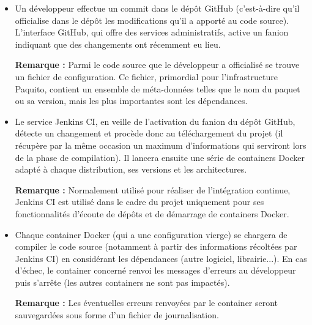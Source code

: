 \documentclass[12pt,a4paper]{article}
\newenvironment{remarque}{\textbf{Remarque :}}{}
\begin{document}
\begin{itemize}\renewcommand{\labelitemi}{$\bullet$}
\item Un développeur effectue un commit dans le dépôt GitHub (c'est-à-dire qu'il officialise dans le dépôt les modifications qu'il a apporté au code source). L'interface GitHub, qui offre des services administratifs, active un fanion indiquant que des changements ont récemment eu lieu.

\begin{remarque}
Parmi le code source que le développeur a officialisé se trouve un fichier de	configuration. Ce fichier, primordial pour l'infrastr\-ucture Paquito, contient un ensemble de 	méta-données telles que le nom du paquet ou sa version, mais les plus importantes sont les dépendances.
\end{remarque}
\item Le service Jenkins CI, en veille de l'activation du fanion du dépôt GitHub, détecte un changement et procède donc au téléchargement du projet (il récupère par la même occasion un maximum d'informations qui serviront lors de la phase de compilation). Il lancera ensuite une série de containers Docker adapté à chaque distribution, ses versions et les architectures.

\begin{remarque}
Normalement utilisé pour réaliser de l'intégration continue, Jenkins CI est utilisé dans le cadre du projet uniquement pour ses fonctionnalités d'écoute de dépôts et de démarrage de containers Docker.
\end{remarque}
\item Chaque container Docker (qui a une configuration vierge) se chargera de compiler le code source (notamment à partir des informations récoltées par Jenkins CI) en considérant les dépendances (autre logiciel, librairie...). En cas d'échec, le container concerné renvoi les messages d'erreurs au développeur puis s'arrête (les autres containers ne sont pas impactés).

\begin{remarque}
Les éventuelles erreurs renvoyées par le container seront sauvegardées sous forme d'un fichier de journalisation.
\end{remarque}


\end{itemize}
\end{document}
